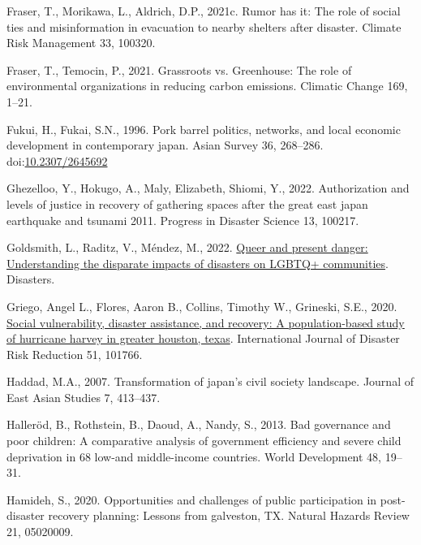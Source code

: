 \documentclass[]{elsarticle} %
\newlength{\cslhangindent}
\newlength{\cslentryspacingunit} %
\newenvironment{CSLReferences}[2] %
 {%
  \setlength{\parindent}{0pt}
  \ifodd #1
  \let\oldpar\par
  \def\par{\hangindent=\cslhangindent\oldpar}
  \fi
  \setlength{\parskip}{#2\cslentryspacingunit}
 }%
 {}
\begin{document}
\begin{CSLReferences}{1}{0}
\leavevmode{}%
Fraser, T., Morikawa, L., Aldrich, D.P., 2021c. Rumor has it: The role
of social ties and misinformation in evacuation to nearby shelters after
disaster. Climate Risk Management 33, 100320.

\leavevmode{}%
Fraser, T., Temocin, P., 2021. Grassroots vs. Greenhouse: The role of
environmental organizations in reducing carbon emissions. Climatic
Change 169, 1--21.

\leavevmode{}%
Fukui, H., Fukai, S.N., 1996. Pork barrel politics, networks, and local
economic development in contemporary japan. Asian Survey 36, 268--286.
doi:\href{https://doi.org/10.2307/2645692}{10.2307/2645692}

\leavevmode{}%
Ghezelloo, Y., Hokugo, A., Maly, Elizabeth, Shiomi, Y., 2022.
Authorization and levels of justice in recovery of gathering spaces
after the great east japan earthquake and tsunami 2011. Progress in
Disaster Science 13, 100217.

\leavevmode{}%
Goldsmith, L., Raditz, V., Méndez, M., 2022.
\href{https://doi.org/10.1111/disa.12509}{Queer and present danger:
Understanding the disparate impacts of disasters on LGBTQ+ communities}.
Disasters.

\leavevmode{}%
Griego, Angel L., Flores, Aaron B., Collins, Timothy W., Grineski, S.E.,
2020. \href{https://doi.org/10.1016/j.ijdrr.2020.101766}{Social
vulnerability, disaster assistance, and recovery: A population-based
study of hurricane harvey in greater houston, texas}. International
Journal of Disaster Risk Reduction 51, 101766.

\leavevmode{}%
Haddad, M.A., 2007. Transformation of japan's civil society landscape.
Journal of East Asian Studies 7, 413--437.

\leavevmode{}%
Halleröd, B., Rothstein, B., Daoud, A., Nandy, S., 2013. Bad governance
and poor children: A comparative analysis of government efficiency and
severe child deprivation in 68 low-and middle-income countries. World
Development 48, 19--31.

\leavevmode{}%
Hamideh, S., 2020. Opportunities and challenges of public participation
in post-disaster recovery planning: Lessons from galveston, TX. Natural
Hazards Review 21, 05020009.


\end{CSLReferences}
\end{document}
